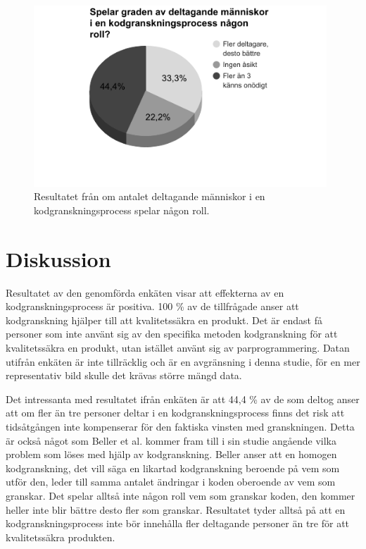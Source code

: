 \begin{figure}[H]
	\centering
	\includegraphics[width=110mm]{figures/grade_participation.png}
	\caption{Resultatet från om antalet deltagande människor i en kodgranskningsprocess spelar någon roll.}
	\label{fig:grade_participation}
\end{figure}

\section{Diskussion}
\label{sec:discussion-wallstrom}
Resultatet av den genomförda enkäten visar att effekterna av en kodgranskningsprocess är positiva. 100 \% av de tillfrågade anser att kodgranskning hjälper till att kvalitetssäkra en produkt. Det är endast få personer som inte använt sig av den specifika metoden kodgranskning för att kvalitetssäkra en produkt, utan istället använt sig av parprogrammering. Datan utifrån enkäten är inte tillräcklig och är en avgränsning i denna studie, för en mer representativ bild skulle det krävas större mängd data. 

Det intressanta med resultatet ifrån enkäten är att 44,4 \% av de som deltog anser att om fler än tre personer deltar i en kodgranskningsprocess finns det risk att tidsåtgången inte kompenserar för den faktiska vinsten med granskningen. Detta är också något som Beller et al. \cite{beller2014modern} kommer fram till i sin studie angående vilka problem som löses med hjälp av kodgranskning. Beller anser att en homogen kodgranskning, det vill säga en likartad kodgranskning beroende på vem som utför den, leder till samma antalet ändringar i koden oberoende av vem som granskar. Det spelar alltså inte någon roll vem som granskar koden, den kommer heller inte blir bättre desto fler som granskar. Resultatet tyder alltså på att en kodgranskningsprocess inte bör innehålla fler deltagande personer än tre för att kvalitetssäkra produkten. 

